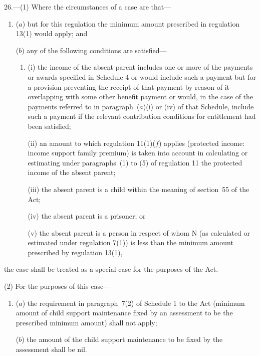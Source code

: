 \documentclass[12pt,a4paper]{article}
\begin{document}
26.—(1) Where the circumstances of a case are that—
\begin{enumerate}\item[]
($a$) but for this regulation the minimum amount prescribed in regulation 13(1) would apply; and

($b$) any of the following conditions are satisfied—
\begin{enumerate}\item[]
(i) the income of the absent parent includes one or more of the payments or awards specified in Schedule 4 or would include such a payment but for a provision preventing the receipt of that payment by reason of it overlapping with some other benefit payment or would, in the case of the payments referred to in paragraph~($a$)(i) or (iv) of that Schedule, include such a payment if the relevant contribution conditions for entitlement had been satisfied;

(ii) an amount to which regulation 
11(1)($f$)  %
applies (protected income: income support family premium) is taken into account in calculating or estimating 
under paragraphs~(1) to (5) of regulation 11  %
the protected income of the absent parent;

(iii) the absent parent is a child within the meaning of section~55 of the Act;

(iv) the absent parent is a prisoner; or

(v) the absent parent is a person in respect of whom N (as calculated or estimated under regulation 7(1)) is less than the minimum amount prescribed by regulation 13(1),
\end{enumerate}
\end{enumerate}
the case shall be treated as a special case for the purposes of the Act.

(2) For the purposes of this case—
\begin{enumerate}\item[]
($a$) the requirement in paragraph~7(2) of Schedule 1 to the Act (minimum amount of child support maintenance fixed by an assessment to be the prescribed minimum amount) shall not apply;

($b$) the amount of the child support maintenance to be fixed by the assessment shall be nil.
\end{enumerate}

\end{document}
